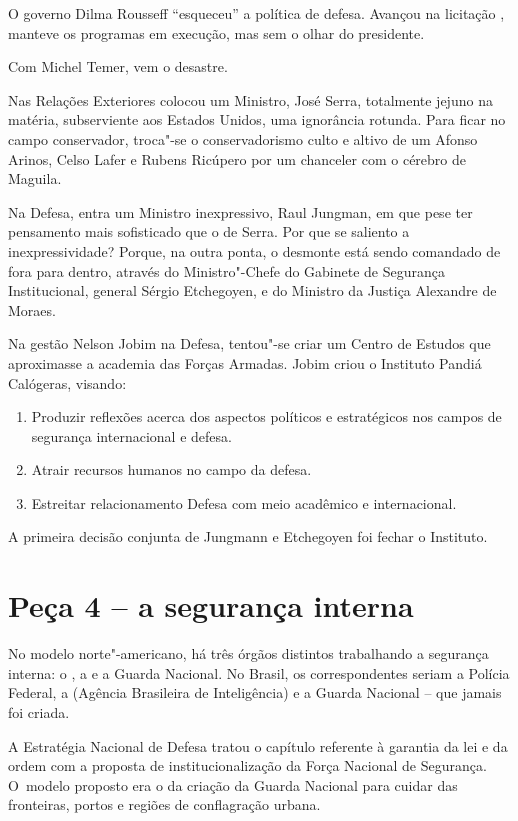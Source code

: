 O governo Dilma Rousseff ``esqueceu'' a política de defesa. Avançou na
licitação , manteve os programas em execução, mas sem o olhar do
presidente.

Com Michel Temer, vem o desastre.

Nas Relações Exteriores colocou um Ministro, José Serra, totalmente
jejuno na matéria, subserviente aos Estados Unidos, uma ignorância
rotunda. Para ficar no campo conservador, troca"-se o conservadorismo
culto e altivo de um Afonso Arinos, Celso Lafer e Rubens Ricúpero por um
chanceler com o cérebro de Maguila.

Na Defesa, entra um Ministro inexpressivo, Raul Jungman, em que pese ter
pensamento mais sofisticado que o de Serra. Por que se saliento a
inexpressividade? Porque, na outra ponta, o desmonte está sendo
comandado de fora para dentro, através do Ministro"-Chefe do Gabinete de
Segurança Institucional, general Sérgio Etchegoyen, e do Ministro da
Justiça Alexandre de Moraes.

Na gestão Nelson Jobim na Defesa, tentou"-se criar um Centro de Estudos
que aproximasse a academia das Forças Armadas. Jobim criou o Instituto
Pandiá Calógeras, visando:

\begin{enumerate}
\itemsep1pt\parskip0pt
\item
  Produzir reflexões acerca dos aspectos políticos e estratégicos nos
  campos de segurança internacional e defesa.
\item
  Atrair recursos humanos no campo da defesa.
\item
  Estreitar relacionamento Defesa com meio acadêmico e internacional.
\end{enumerate}

A primeira decisão conjunta de Jungmann e Etchegoyen foi fechar o
Instituto.

\section{Peça 4 -- a segurança interna}

No modelo norte"-americano, há três órgãos distintos trabalhando a
segurança interna: o , a  e a Guarda Nacional. No Brasil, os
correspondentes seriam a Polícia Federal, a  (Agência Brasileira de
Inteligência) e a Guarda Nacional -- que jamais foi criada.

A Estratégia Nacional de Defesa tratou o capítulo referente à garantia
da lei e da ordem com a proposta de institucionalização da Força
Nacional de Segurança. O~modelo proposto era o da criação da Guarda
Nacional para cuidar das fronteiras, portos e regiões de conflagração
urbana.

